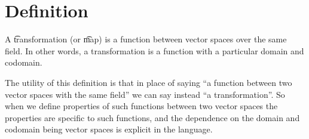
\section*{Definition}

A \t{transformation} (or \t{map}) is a function between vector spaces over the same field.
In other words, a transformation is a function with a particular domain and codomain.

The utility of this definition is that in place of saying ``a function between two vector spaces with the same field'' we can say instead ``a transformation''.
So when we define properties of such functions between two vector spaces the properties are specific to such functions, and the dependence on the domain and codomain being vector spaces is explicit in the language.

\blankpage